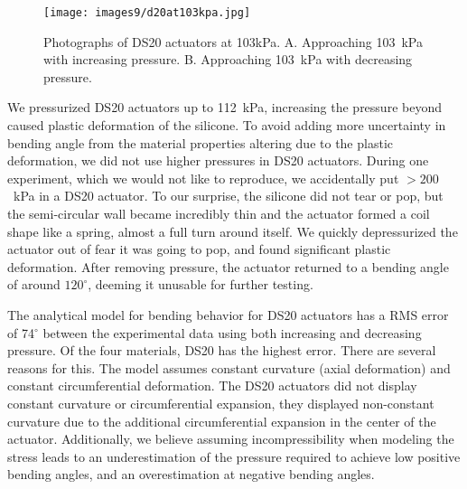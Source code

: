 \begin{figure}[ht]
    \centering
     \texttt{[image: images9/d20at103kpa.jpg]}
    \caption{Photographs of DS20 actuators at 103kPa. A. Approaching 103~kPa with increasing pressure. B. Approaching 103~kPa with decreasing pressure.}
    \label{fig:d20at103kpa}
\end{figure}

We pressurized DS20 actuators up to 112~kPa, increasing the pressure beyond caused plastic deformation of the silicone. To avoid adding more uncertainty in bending angle from the material properties altering due to the plastic deformation, we did not use higher pressures in DS20 actuators. During one experiment, which we would not like to reproduce, we accidentally put $>200$~kPa in a DS20 actuator. To our surprise, the silicone did not tear or pop, but the semi-circular wall became incredibly thin and the actuator formed a coil shape like a spring, almost a full turn around itself. We quickly depressurized the actuator out of fear it was going to pop, and found significant plastic deformation. After removing pressure, the actuator returned to a bending angle of around $120^\circ$, deeming it unusable for further testing. 

The analytical model for bending behavior for DS20 actuators has a RMS error of 74$^\circ$ between the experimental data using both increasing and decreasing pressure. Of the four materials, DS20 has the highest error. There are several reasons for this. The model assumes constant curvature (axial deformation) and constant circumferential deformation. The DS20 actuators did not display constant curvature or circumferential expansion, they displayed non-constant curvature due to the additional circumferential expansion in the center of the actuator. Additionally, we believe assuming incompressibility when modeling the stress leads to an underestimation of the pressure required to achieve low positive bending angles, and an overestimation at negative bending angles. 